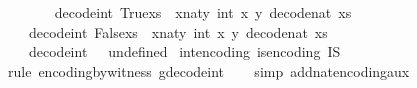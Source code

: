 \begin{isabellebody}
\ \ \ \isanewline
\ \ \ \ {\isachardoublequoteopen}decode{\isacharunderscore}{\kern0pt}int\ {\isacharparenleft}{\kern0pt}True{\isacharhash}{\kern0pt}xs{\isacharparenright}{\kern0pt}\ {\isacharequal}{\kern0pt}\ {\isacharparenleft}{\kern0pt}{\isasymlambda}{\isacharparenleft}{\kern0pt}x{\isacharcolon}{\kern0pt}{\isacharcolon}{\kern0pt}nat{\isacharcomma}{\kern0pt}y{\isacharparenright}{\kern0pt}{\isachardot}{\kern0pt}\ {\isacharparenleft}{\kern0pt}int\ x{\isacharcomma}{\kern0pt}\ y{\isacharparenright}{\kern0pt}{\isacharparenright}{\kern0pt}\ {\isacharparenleft}{\kern0pt}decode{\isacharunderscore}{\kern0pt}nat\ xs{\isacharparenright}{\kern0pt}{\isachardoublequoteclose}\ {\isacharbar}{\kern0pt}\ \isanewline
\ \ \ \ {\isachardoublequoteopen}decode{\isacharunderscore}{\kern0pt}int\ {\isacharparenleft}{\kern0pt}False{\isacharhash}{\kern0pt}xs{\isacharparenright}{\kern0pt}\ {\isacharequal}{\kern0pt}\ {\isacharparenleft}{\kern0pt}{\isasymlambda}{\isacharparenleft}{\kern0pt}x{\isacharcolon}{\kern0pt}{\isacharcolon}{\kern0pt}nat{\isacharcomma}{\kern0pt}y{\isacharparenright}{\kern0pt}{\isachardot}{\kern0pt}\ {\isacharparenleft}{\kern0pt}{\isacharminus}{\kern0pt}{\isacharparenleft}{\kern0pt}int\ x{\isacharparenright}{\kern0pt}{\isacharminus}{\kern0pt}{}{\isacharcomma}{\kern0pt}\ y{\isacharparenright}{\kern0pt}{\isacharparenright}{\kern0pt}\ {\isacharparenleft}{\kern0pt}decode{\isacharunderscore}{\kern0pt}nat\ xs{\isacharparenright}{\kern0pt}{\isachardoublequoteclose}\ {\isacharbar}{\kern0pt}\isanewline
\ \ \ \ {\isachardoublequoteopen}decode{\isacharunderscore}{\kern0pt}int\ {\isacharbrackleft}{\kern0pt}{\isacharbrackright}{\kern0pt}\ {\isacharequal}{\kern0pt}\ undefined{\isachardoublequoteclose}\isanewline
\isanewline
{}\isamarkupfalse%
\ int{\isacharunderscore}{\kern0pt}encoding{\isacharcolon}{\kern0pt}\ {\isachardoublequoteopen}is{\isacharunderscore}{\kern0pt}encoding\ I\isactrlsub S{\isachardoublequoteclose}\isanewline
%
\isadelimproof
\ \ %
\endisadelimproof
%
\isatagproof
{}\isamarkupfalse%
\ {\isacharparenleft}{\kern0pt}rule\ encoding{\isacharunderscore}{\kern0pt}by{\isacharunderscore}{\kern0pt}witness{\isacharbrackleft}{\kern0pt}\ g{\isacharequal}{\kern0pt}{\isachardoublequoteopen}decode{\isacharunderscore}{\kern0pt}int{\isachardoublequoteclose}{\isacharbrackright}{\kern0pt}{\isacharparenright}{\kern0pt}\isanewline
\ \ \isamarkupfalse%
\ {\isacharparenleft}{\kern0pt}simp\ add{\isacharcolon}{\kern0pt}nat{\isacharunderscore}{\kern0pt}encoding{\isacharunderscore}{\kern0pt}aux{\isacharparenright}{\kern0pt}%

\end{isabellebody}
